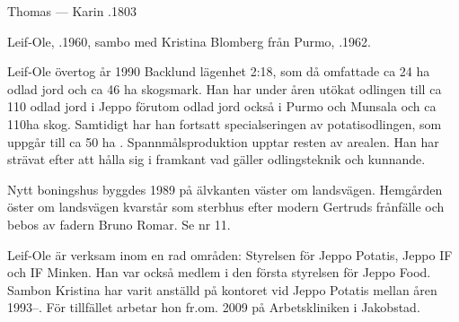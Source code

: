 Thomas   ---  Karin .1803






Leif-Ole, .1960, sambo med Kristina Blomberg från Purmo, .1962.
\begin{jhchildren}
  \item {}
  \item {}
\end{jhchildren}
Leif-Ole övertog år 1990 Backlund lägenhet 2:18, som då omfattade ca 24 ha odlad jord och ca 46 ha skogsmark. Han har under åren utökat odlingen till ca 110 odlad jord i Jeppo förutom odlad jord också i Purmo och Munsala och ca 110ha skog. Samtidigt har han fortsatt specialseringen av potatisodlingen, som uppgår till ca 50 ha . Spannmålsproduktion upptar resten av arealen. Han har strävat efter att hålla sig i framkant vad gäller odlingsteknik och kunnande.

Nytt boningshus byggdes 1989 på älvkanten väster om landsvägen. Hemgården öster om landsvägen kvarstår som sterbhus efter modern Gertruds frånfälle och bebos av fadern Bruno Romar. Se nr 11.

Leif-Ole är verksam inom en rad områden: Styrelsen för Jeppo Potatis, Jeppo IF och IF Minken. Han var också medlem i den första styrelsen för Jeppo Food. Sambon Kristina har varit anställd på kontoret vid Jeppo Potatis mellan åren 1993--. För tillfället arbetar hon fr.om. 2009 på Arbetskliniken i Jakobstad.







